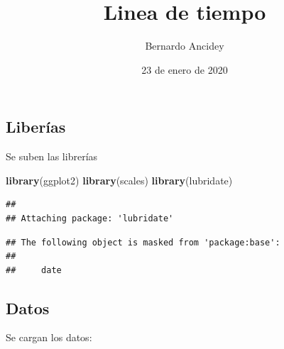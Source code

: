 \documentclass[]{article}
\title{Linea de tiempo}
\author{Bernardo Ancidey}
\date{23 de enero de 2020}
\newenvironment{Shaded}{\begin{snugshade}}{\end{snugshade}}
\newcommand{\KeywordTok}[1]{\textcolor[rgb]{0.13,0.29,0.53}{\textbf{#1}}}
\newcommand{\NormalTok}[1]{#1}
\begin{document}
\maketitle

\hypertarget{liberias}{%
\subsection{Liberías}\label{liberias}}

Se suben las librerías

\begin{Shaded}
\begin{Highlighting}[]
\KeywordTok{library}\NormalTok{(ggplot2)}
\KeywordTok{library}\NormalTok{(scales)}
\KeywordTok{library}\NormalTok{(lubridate)}
\end{Highlighting}
\end{Shaded}

\begin{verbatim}
## 
## Attaching package: 'lubridate'
\end{verbatim}

\begin{verbatim}
## The following object is masked from 'package:base':
## 
##     date
\end{verbatim}

\hypertarget{datos}{%
\subsection{Datos}\label{datos}}

Se cargan los datos:
\end{document}
